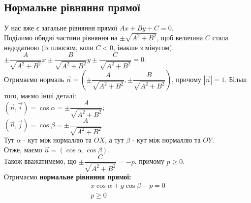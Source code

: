 \documentclass[a4paper, 10pt]{extarticle}
\theoremstyle{theoremdd}
\theoremstyle{theoremdd}
\theoremstyle{theoremdd}
\theoremstyle{theoremdd}
\theoremstyle{theoremdd}
\theoremstyle{theoremdd}
\theoremstyle{theoremdd}
\theoremstyle{theoremdd}
\begin{document}
\subsection{Нормальне рівняння прямої}
У нас вже є загальне рівняння прямої $Ax + By + C = 0$.\\
Поділимо обидві частини рівняння на $\pm \sqrt{A^2+B^2}$, щоб величина $C$ стала недодатною (із плюсюм, коли $C<0$, інакше з мінусом).\\
$\pm \dfrac{A}{\sqrt{A^2+B^2}}x \pm \dfrac{B}{\sqrt{A^2+B^2}}y \pm \dfrac{C}{\sqrt{A^2+B^2}} = 0$.\\
Отримаємо нормаль $\vec{n} = \left(\pm \dfrac{A}{\sqrt{A^2+B^2}}, \pm \dfrac{B}{\sqrt{A^2+B^2}} \right)$, причому $|\vec{n}| = 1$. Більш того, маємо інші деталі:\\
$(\vec{n}, \vec{i}) = \cos \alpha = \pm \dfrac{A}{\sqrt{A^2+B^2}}$;\\
$(\vec{n}, \vec{j}) = \cos \beta = \pm \dfrac{A}{\sqrt{A^2+B^2}}$.\\
Тут $\alpha$ - кут між нормаллю та $OX$, а тут $\beta$ - кут між нормаллю та $OY$.\\
Отже, маємо $\vec{n} = (\cos \alpha, \cos \beta)$.\\
Також вважатимемо, що $\pm \dfrac{C}{\sqrt{A^2+B^2}} = -p$, причому $p \geq 0$.\\
Отримаємо \textbf{нормальне рівняння прямої:}
\begin{align*}
x \cos \alpha + y \cos \beta - p = 0\\
p \geq 0
\end{align*}

\begin{figure}[H]
\centering
{}
\end{figure}
\end{document}
